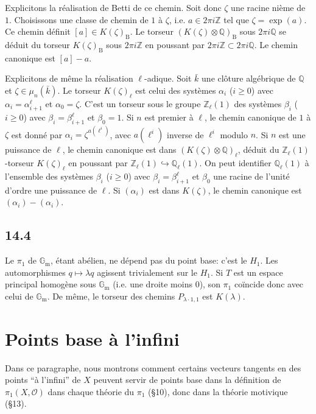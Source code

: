 \documentclass[12pt,a4paper]{article}
\theoremstyle{plain}
\theoremstyle{definition}
\theoremstyle{remark}
\newcommand*{\Gm}{\mathbb{G}_\mathrm{m}}
\newcommand{\cO}{\mathcal{O}}
\newcommand{\bZ}{\mathbb{Z}}
\newcommand{\bQ}{\mathbb{Q}}
\newcommand{\B}{\mathrm{B}}
\begin{document}
Explicitons la réalisation de Betti de ce chemin. Soit donc $\zeta$ une racine nième de $1$. Choisissons une classe de chemin de $1$ à $\zeta$, i.e. $a \in 2\pi i \bZ$ tel que $\zeta = \exp(a)$. Ce chemin définit $[a] \in K(\zeta)_{\B}$. Le torseur $(K(\zeta) \otimes \bQ)_{\B}$ sous $2\pi i \bQ$ se déduit du torseur $K(\zeta)_{\B}$ sous $2\pi i \bZ$ en poussant par $2\pi i \bZ \subset 2\pi i \bQ$. Le chemin canonique est $[a] - a$.

Explicitons de même la réalisation $\ell$-adique. Soit $\bar{k}$ une clôture algébrique de $\bQ$ et $\zeta \in \mu_n(\bar{k})$. Le torseur $K(\zeta)_{\ell}$ est celui des systèmes $\alpha_i$ ($i \geqslant 0$) avec $\alpha_i = \alpha_{i+1}^{\ell}$ et $\alpha_0 = \zeta$. C'est un torseur sous le groupe $\bZ_\ell(1)$ des systèmes $\beta_i$ ($i \geqslant 0$) avec $\beta_i = \beta_{i+1}^{\ell}$ et $\beta_0 = 1$. Si $n$ est premier à $\ell$, le chemin canonique de $1$ à $\zeta$ est donné par $\alpha_i = \zeta^{a(\ell^i)}$, avec $a(\ell^i)$ inverse de $\ell^i$ modulo $n$. Si $n$ est une puissance de $\ell$, le chemin canonique est dans $(K(\zeta) \otimes \bQ)_{\ell}$, déduit du $\bZ_\ell(1)$-torseur $K(\zeta)_{\ell}$ en poussant par $\bZ_\ell(1) \hookrightarrow \bQ_\ell(1)$. On peut identifier $\bQ_\ell(1)$ à l'ensemble des systèmes $\beta_i$ ($i \geqslant 0$) avec $\beta_i = \beta_{i+1}^{\ell}$ et $\beta_0$ une racine de l'unité d'ordre une puissance de $\ell$. Si $(\alpha_i)$ est dans $K(\zeta)$, le chemin canonique est $(\alpha_i) - (\alpha_i)$.

\subsection*{14.4}

Le $\pi_1$ de $\Gm$, étant abélien, ne dépend pas du point base: c'est le $H_1$. Les automorphismes $q \mapsto \lambda q$ agissent trivialement sur le $H_1$. Si $T$ est un espace principal homogène sous $\Gm$ (i.e. une droite moins $0$), son $\pi_1$ coïncide donc avec celui de $\Gm$. De même, le torseur des chemins $P_{\lambda \cdot 1, 1}$ est $K(\lambda)$.


\section{Points base à l'infini}\label{sec:15}

Dans ce paragraphe, nous montrons comment certains vecteurs tangents en des points ``à l'infini'' de $X$ peuvent servir de points base dans la définition de $\pi_1(X, \cO)$ dans chaque théorie du $\pi_1$ (§10), donc dans la théorie motivique (§13).
\end{document}
